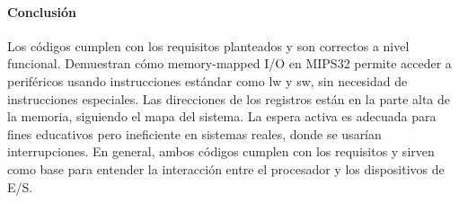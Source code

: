 \documentclass[12pt]{article}
\begin{document}
\begin{center}
\paragraph*{Conclusión}
\end{center}

\begin{center}
Los códigos cumplen con los requisitos planteados y son correctos a nivel funcional. Demuestran cómo memory-mapped I/O en MIPS32 permite acceder a periféricos usando instrucciones estándar como lw y sw, sin necesidad de instrucciones especiales. Las direcciones de los registros están en la parte alta de la memoria, siguiendo el mapa del sistema. La espera activa es adecuada para fines educativos pero ineficiente en sistemas reales, donde se usarían interrupciones. En general, ambos códigos cumplen con los requisitos y sirven como base para entender la interacción entre el procesador y los dispositivos de E/S.
\end{center}
\end{document}
